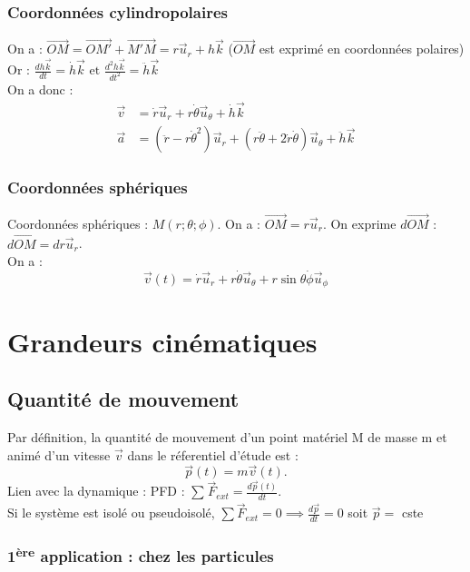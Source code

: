 \documentclass{article}
\begin{document}
\subsubsection{Coordonnées cylindropolaires}
On a : $\vec{OM} = \vec{OM'}+\vec{M'M} = r\vec{u}_r + h\vec{k}$ ($\vec{OM}$ est exprimé en coordonnées polaires)\\
Or : $\frac{dh\vec{k}}{dt} = \dot{h}\vec{k} \text{ et } \frac{d^2h\vec{k}}{dt^2} = \ddot{h}\vec{k}$\\
On a donc : 
\begin{align*}
    \vec{v} &= \dot{r}\vec{u}_r + r\dot{\theta}\vec{u}_\theta + \dot{h}\vec{k}\\
    \vec{a} &= (\ddot{r} - r \dot{\theta}^2)\vec{u}_r + (r\ddot{\theta} +2\dot{r}\dot{\theta})\vec{u}_\theta + \ddot{h}\vec{k}
\end{align*}
\subsubsection{Coordonnées sphériques}


Coordonnées sphériques : $M(r;\theta;\phi)$. On a : $\vec{OM} = r\vec{u}_r$. On exprime $d\vec{OM}$ : $d\vec{OM} = dr \vec{u}_r$.\\
On a : 
\[
\vec{v}(t) = \dot{r}\vec{u}_r + r\dot{\theta}\vec{u}_\theta + r\sin\theta\dot{\phi}\vec{u}_\phi
\]

\section{Grandeurs cinématiques}
\subsection{Quantité de mouvement}
Par définition, la quantité de mouvement d'un point matériel M de masse m et animé d'un vitesse $\vec{v}$ dans le réferentiel d'étude est : \\\[
\vec{p}(t) = m\vec{v}(t)
.\] 
Lien avec la dynamique : PFD : $\sum_{}^{} \vec{F}_{ext} = \frac{d\vec{p}(t)}{dt}$. \\
Si le système est isolé ou pseudoisolé, $\sum \vec{F}_{ext} = 0 \implies \frac{d\vec{p}}{dt} = 0$ soit $\vec{p} = $ cste
\subsubsection{1\textsuperscript{ère} application : chez les particules}
\end{document}
